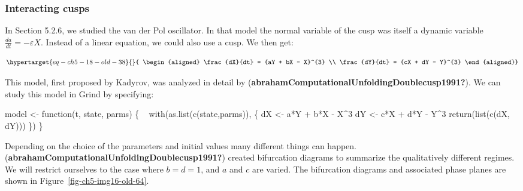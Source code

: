 \documentclass[
  letterpaper,
]{scrbook}
\newenvironment{Shaded}{\begin{snugshade}}{\end{snugshade}}
\newcommand{\ControlFlowTok}[1]{\textcolor[rgb]{0.00,0.23,0.31}{#1}}
\newcommand{\DecValTok}[1]{\textcolor[rgb]{0.68,0.00,0.00}{#1}}
\newcommand{\FunctionTok}[1]{\textcolor[rgb]{0.28,0.35,0.67}{#1}}
\newcommand{\NormalTok}[1]{\textcolor[rgb]{0.00,0.23,0.31}{#1}}
\newcommand{\OtherTok}[1]{\textcolor[rgb]{0.00,0.23,0.31}{#1}}
\newcommand{\SpecialCharTok}[1]{\textcolor[rgb]{0.37,0.37,0.37}{#1}}
\begin{document}
\hypertarget{interacting-cusps}{%
\subsubsection{Interacting cusps}\label{interacting-cusps}}

In Section 5.2.6, we studied the van der Pol oscillator. In that model
the normal variable of the cusp was itself a dynamic variable
\(\frac{da}{dt}= - \varepsilon X\). Instead of a linear equation, we
could also use a cusp. We then get:

\begin{equation}\protect\hypertarget{eq-ch5-18-old-38}{}{
\begin{align*}
\frac{dX}{dt} = {aY + bX - X}^{3} \\
\frac{dY}{dt} = {cX + dY - Y}^{3} 
\end{align*}}\label{eq-ch5-18-old-38}\end{equation}

This model, first proposed by Kadyrov, was analyzed in detail by
(\textbf{abrahamComputationalUnfoldingDoublecusp1991?}). We can study
this model in Grind by specifying:

\begin{Shaded}
\begin{Highlighting}[]
\NormalTok{model }\OtherTok{\textless{}{-}} \ControlFlowTok{function}\NormalTok{(t, state, parms) \{   }
  \FunctionTok{with}\NormalTok{(}\FunctionTok{as.list}\NormalTok{(}\FunctionTok{c}\NormalTok{(state,parms)), \{}
\NormalTok{    dX }\OtherTok{\textless{}{-}}\NormalTok{ a}\SpecialCharTok{*}\NormalTok{Y }\SpecialCharTok{+}\NormalTok{ b}\SpecialCharTok{*}\NormalTok{X }\SpecialCharTok{{-}}\NormalTok{ X}\SpecialCharTok{\^{}}\DecValTok{3} 
\NormalTok{    dY }\OtherTok{\textless{}{-}}\NormalTok{ c}\SpecialCharTok{*}\NormalTok{X }\SpecialCharTok{+}\NormalTok{ d}\SpecialCharTok{*}\NormalTok{Y }\SpecialCharTok{{-}}\NormalTok{ Y}\SpecialCharTok{\^{}}\DecValTok{3}
    \FunctionTok{return}\NormalTok{(}\FunctionTok{list}\NormalTok{(}\FunctionTok{c}\NormalTok{(dX, dY))) }
\NormalTok{  \})}
\NormalTok{\}}
\end{Highlighting}
\end{Shaded}

Depending on the choice of the parameters and initial values many
different things can happen.
(\textbf{abrahamComputationalUnfoldingDoublecusp1991?}) created
bifurcation diagrams to summarize the qualitatively different regimes.
We will restrict ourselves to the case where \(b = d = 1\), and \(a\)
and \(c\) are varied. The bifurcation diagrams and associated phase
planes are shown in Figure~\ref{fig-ch5-img16-old-64}.
\end{document}
